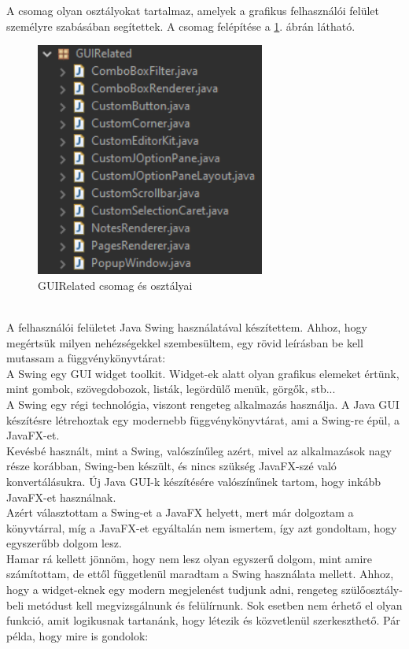 A csomag olyan osztályokat tartalmaz, amelyek a grafikus felhasználói felület személyre szabásában segítettek. A csomag felépítése a \ref{fig:package_guirelated}. ábrán látható.
\begin{figure}[h]
	\centering
	\includegraphics[scale=0.6]{images/package_guirelated.png}
	\caption{GUIRelated csomag és osztályai}
	\label{fig:package_guirelated}
\end{figure}
\\A felhasználói felületet Java Swing használatával készítettem. Ahhoz, hogy megértsük milyen nehézségekkel szembesültem, egy rövid leírásban be kell mutassam a függvénykönyvtárat:
\vspace{10pt}\\A Swing egy GUI widget toolkit. Widget-ek alatt olyan grafikus elemeket értünk, mint gombok, szövegdobozok, listák, legördülő menük, görgők, stb...
\\A Swing egy régi technológia, viszont rengeteg alkalmazás használja. A Java GUI készítésre létrehoztak egy modernebb függvénykönyvtárat, ami a Swing-re épül, a JavaFX-et.
\\Kevésbé használt, mint a Swing, valószínűleg azért, mivel az alkalmazások nagy része korábban, Swing-ben készült, és nincs szükség JavaFX-szé való konvertálásukra. Új Java GUI-k készítésére valószínűnek tartom, hogy inkább JavaFX-et használnak.
\vspace{10pt}\\Azért választottam a Swing-et a JavaFX helyett, mert már dolgoztam a könyvtárral, míg a JavaFX-et egyáltalán nem ismertem, így azt gondoltam, hogy egyszerűbb dolgom lesz.
\\Hamar rá kellett jönnöm, hogy nem lesz olyan egyszerű dolgom, mint amire számítottam, de ettől függetlenül maradtam a Swing használata mellett. Ahhoz, hogy a widget-eknek egy modern megjelenést tudjunk adni, rengeteg szülőosztály-beli metódust kell megvizsgálnunk és felülírnunk. Sok esetben nem érhető el olyan funkció, amit logikusnak tartanánk, hogy létezik és közvetlenül szerkeszthető. Pár példa, hogy mire is gondolok:
